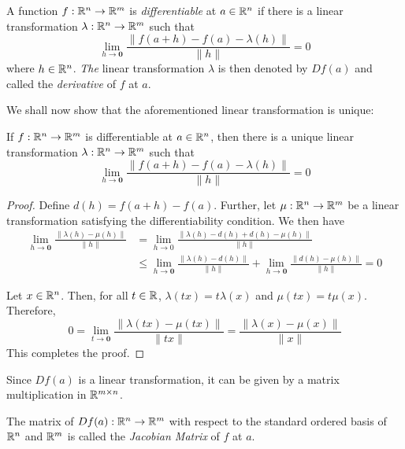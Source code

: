 \newcommand{\0}{\mathbf{0}}
\begin{definition}[Differentiable]
    A function $f:\mathbb{R}^n\to\mathbb{R}^m$ is \textit{differentiable} at $a\in\mathbb{R}^n$ if there is a linear transformation $\lambda:\mathbb{R}^n\to\mathbb{R}^m$ such that 
    \begin{equation*}
        \lim_{h\to\mathbf{0}}\frac{\|f(a + h) - f(a) - \lambda(h)\|}{\|h\|} = 0
    \end{equation*}
    where $h\in\mathbb{R}^n$. \textit{The} linear transformation $\lambda$ is then denoted by $Df(a)$ and called the \textit{derivative} of $f$ at $a$.
\end{definition}


We shall now show that the aforementioned linear transformation is unique: 
\begin{proposition}
    If $f:\mathbb{R}^n\to\mathbb{R}^m$ is differentiable at $a\in\mathbb{R}^n$, then there is a unique linear transformation $\lambda:\mathbb{R}^n\to\mathbb{R}^m$ such that 
    \begin{equation*}
        \lim_{h\to\mathbf{0}}\frac{\|f(a + h) - f(a) - \lambda(h)\|}{\|h\|} = 0
    \end{equation*}
\end{proposition}
\begin{proof}
    Define $d(h) = f(a + h) - f(a)$. Further, let $\mu:\mathbb{R}^n\to\mathbb{R}^m$ be a linear transformation satisfying the differentiability condition. We then have 
    \begin{align*}
        \lim_{h\to \0}\frac{\|\lambda(h) - \mu(h)\|}{\|h\|} &= \lim_{h\to 0}\frac{\|\lambda(h) - d(h) + d(h) - \mu(h)\|}{\|h\|}\\
        &\le\lim_{h\to\0}\frac{\|\lambda(h) - d(h)\|}{\|h\|} + \lim_{h\to\0}\frac{\|d(h) - \mu(h)\|}{\|h\|} = 0
    \end{align*}
    
    Let $x\in\mathbb{R}^n$. Then, for all $t\in\mathbb{R}$, $\lambda(tx) = t\lambda(x)$ and $\mu(tx) = t\mu(x)$. Therefore, 
    \begin{equation*}
        0 = \lim_{t\to\0}\frac{\|\lambda(tx) - \mu(tx)\|}{\|tx\|} = \frac{\|\lambda(x) - \mu(x)\|}{\|x\|}
    \end{equation*}
    This completes the proof.
\end{proof}

Since $Df(a)$ is a linear transformation, it can be given by a matrix multiplication in $\mathbb{R}^{m\times n}$.

\begin{definition}
    The matrix of $Df(a):\mathbb{R}^n\to\mathbb{R}^m$ with respect to the standard ordered basis of $\mathbb{R}^n$ and $\mathbb{R}^m$ is called the \textit{Jacobian Matrix} of $f$ at $a$.
\end{definition}

